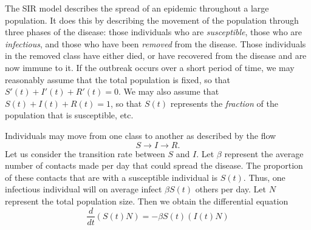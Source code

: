 %
%
%
%
%
%
%
%
The SIR model describes the spread of an epidemic throughout a large population.
It does this by describing the movement of the population through three phases of the disease: those individuals who are \emph{susceptible}, those who are \emph{infectious}, and those who have been \emph{removed} from the disease.
Those individuals in the removed class have either died, or have recovered from the disease and are now immune to it.
If the outbreak occurs over a short period of time, we may reasonably assume that the total population is fixed, so that $S'(t) + I'(t) + R'(t) = 0$.
We may also assume that $S(t) + I(t) + R(t) = 1$, so that $S(t)$ represents the \textit{fraction} of the population that is susceptible, etc.

Individuals may move from one class to another as described by the flow
\[S \to I \to R.\]
Let us consider the transition rate between $S$ and $I $.
Let $\beta$ represent the average number of contacts made per day that could spread the disease.
The proportion of these contacts that are with a susceptible individual is $S(t)$.
Thus, one infectious individual will on average infect $\beta S(t)$ others per day.
Let $N$ represent the total population size.
Then we obtain the differential equation
\[\frac{d}{dt}(S(t) N) = -\beta S(t) (I(t) N)\]

